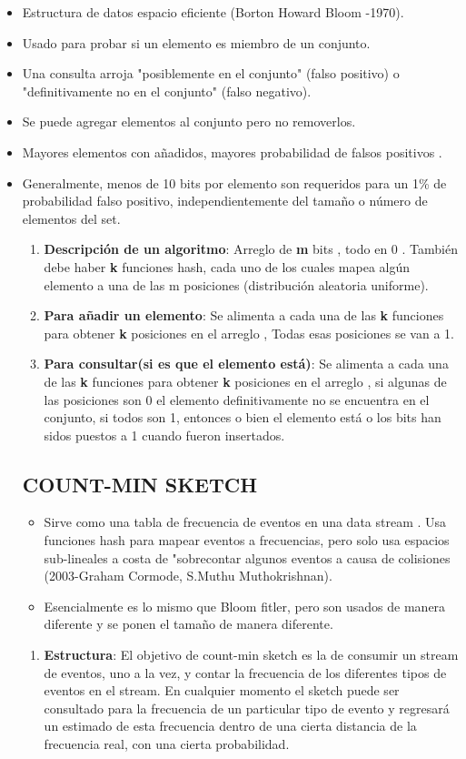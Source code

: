 \documentclass[journal]{IEEEtran}
\begin{document}
\begin{itemize}
    \item Estructura de datos espacio eficiente (Borton Howard Bloom -1970).
    \item Usado para probar si un elemento es miembro de un conjunto.
    \item Una consulta arroja "posiblemente en el conjunto" (falso positivo)  o "definitivamente no en el conjunto" (falso negativo).
    \item Se puede agregar elementos al conjunto pero no removerlos.
    \item Mayores elementos con añadidos, mayores probabilidad de falsos positivos .
    \item Generalmente, menos de 10 bits por elemento son requeridos para un 1\% de probabilidad falso positivo, independientemente del tamaño o número de elementos del set.\\
    \begin{enumerate}
    \item {\bf Descripción de un algoritmo}: Arreglo de \textbf{m} bits , todo en 0 . También debe haber \textbf{k} funciones hash, cada uno de los cuales mapea algún elemento a una de las m posiciones (distribución aleatoria uniforme). 
    \item {\bf Para añadir un elemento}: Se alimenta a cada una de las \textbf{k} funciones para obtener \textbf{k} posiciones en el arreglo , Todas esas posiciones se van a 1.
    \item {\bf Para consultar(si es que el elemento está)}: Se alimenta a cada una de las \textbf{k} funciones para obtener \textbf{k} posiciones en el arreglo , si algunas de las posiciones son 0 el elemento definitivamente no se encuentra en el conjunto, si todos son 1, entonces o bien el elemento está o los bits han sidos puestos a 1 cuando fueron insertados.
\end{enumerate}
\subsection{COUNT-MIN SKETCH}
\begin{itemize}
    \item Sirve como una tabla de frecuencia de eventos en una data stream . Usa funciones hash para mapear eventos a frecuencias, pero solo usa espacios sub-lineales a costa de "sobrecontar algunos eventos a causa de colisiones (2003-Graham Cormode, S.Muthu Muthokrishnan).
    \item Esencialmente es lo mismo que Bloom fitler, pero son usados de manera diferente y se ponen el tamaño de manera diferente.
\end{itemize}
\begin{enumerate}
    \item {\bf Estructura}: El objetivo de count-min sketch es la de consumir un stream de eventos, uno a la vez, y contar la frecuencia de los diferentes tipos de eventos en el stream. En cualquier momento el sketch puede ser consultado para la frecuencia de un particular tipo de evento y regresará un estimado de esta frecuencia dentro de una cierta distancia de la frecuencia real, con una cierta probabilidad.
\end{enumerate}

\end{itemize}
\end{document}
